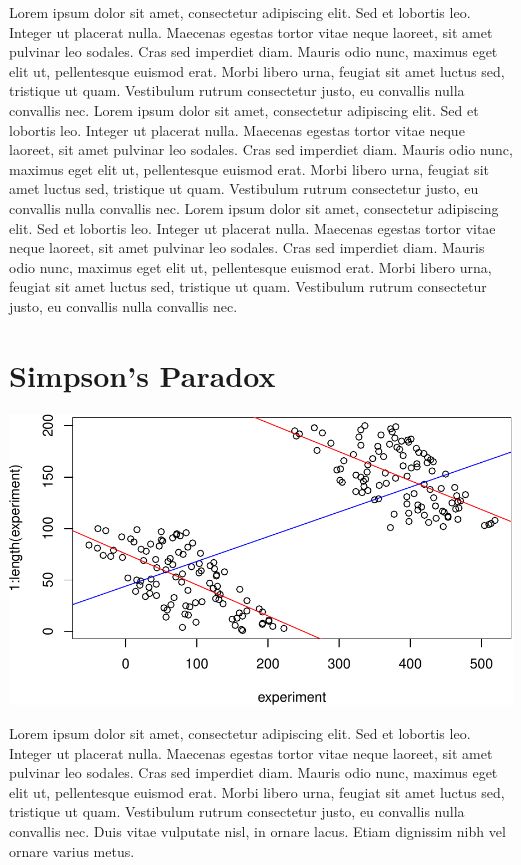 \documentclass[floatsintext,man]{apa6}
\theoremstyle{definition}
\theoremstyle{definition}
\theoremstyle{definition}
\theoremstyle{remark}
\begin{document}
Lorem ipsum dolor sit amet, consectetur adipiscing elit. Sed et lobortis
leo. Integer ut placerat nulla. Maecenas egestas tortor vitae neque
laoreet, sit amet pulvinar leo sodales. Cras sed imperdiet diam. Mauris
odio nunc, maximus eget elit ut, pellentesque euismod erat. Morbi libero
urna, feugiat sit amet luctus sed, tristique ut quam. Vestibulum rutrum
consectetur justo, eu convallis nulla convallis nec. Lorem ipsum dolor
sit amet, consectetur adipiscing elit. Sed et lobortis leo. Integer ut
placerat nulla. Maecenas egestas tortor vitae neque laoreet, sit amet
pulvinar leo sodales. Cras sed imperdiet diam. Mauris odio nunc, maximus
eget elit ut, pellentesque euismod erat. Morbi libero urna, feugiat sit
amet luctus sed, tristique ut quam. Vestibulum rutrum consectetur justo,
eu convallis nulla convallis nec. Lorem ipsum dolor sit amet,
consectetur adipiscing elit. Sed et lobortis leo. Integer ut placerat
nulla. Maecenas egestas tortor vitae neque laoreet, sit amet pulvinar
leo sodales. Cras sed imperdiet diam. Mauris odio nunc, maximus eget
elit ut, pellentesque euismod erat. Morbi libero urna, feugiat sit amet
luctus sed, tristique ut quam. Vestibulum rutrum consectetur justo, eu
convallis nulla convallis nec.

\hypertarget{simpsons-paradox}{%
\section{Simpson's Paradox}\label{simpsons-paradox}}

\includegraphics{Example_Paper_files/figure-latex/unnamed-chunk-4-1.pdf}

Lorem ipsum dolor sit amet, consectetur adipiscing elit. Sed et lobortis
leo. Integer ut placerat nulla. Maecenas egestas tortor vitae neque
laoreet, sit amet pulvinar leo sodales. Cras sed imperdiet diam. Mauris
odio nunc, maximus eget elit ut, pellentesque euismod erat. Morbi libero
urna, feugiat sit amet luctus sed, tristique ut quam. Vestibulum rutrum
consectetur justo, eu convallis nulla convallis nec. Duis vitae
vulputate nisl, in ornare lacus. Etiam dignissim nibh vel ornare varius
metus.
\end{document}
